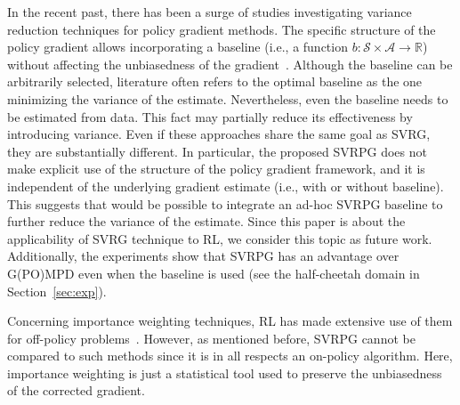\documentclass{article}
\makeatletter
\theoremstyle{remark}
\theoremstyle{definition}
\DeclareRobustCommand{\eg}{e.g.,\@\xspace}
\DeclareRobustCommand{\ie}{i.e.,\@\xspace}
\newcommand{\realspace}{\mathbb R}      %
\makeatother
\begin{document}
In the recent past, there has been a surge of studies investigating variance reduction techniques for policy gradient methods.
The specific structure of the policy gradient allows incorporating a baseline (\ie a function $b :\mathcal{S}\times\mathcal{A} \to \realspace$) without affecting the unbiasedness of the gradient~\citep[\eg][]{williams1992simple,weaver2001optimal,peters2008reinforcement,Thomas2017actionbaseline,wu2018variance}.
Although the baseline can be arbitrarily selected, literature often refers to the optimal baseline as the one minimizing the variance of the estimate.
Nevertheless, even the baseline needs to be estimated from data. This fact may partially reduce its effectiveness by introducing variance.
Even if these approaches share the same goal as SVRG, they are substantially different.
In particular, the proposed SVRPG does not make explicit use of the structure of the policy gradient framework, and it is independent of the underlying gradient estimate (\ie with or without baseline).
This suggests that would be possible to integrate an ad-hoc SVRPG baseline to further reduce the variance of the estimate.
Since this paper is about the applicability of SVRG technique to RL, we consider this topic as future work.
Additionally, the experiments show that SVRPG has an advantage over G(PO)MPD even when the baseline is used (see the half-cheetah domain in Section~\ref{sec:exp}).

Concerning importance weighting techniques, RL has made extensive use of them for off-policy problems~\citep[\eg][]{precup2000eligibility,thomas2015high}. However, as mentioned before, SVRPG cannot be compared to such methods since it is in all respects an on-policy algorithm. Here, importance weighting is just a statistical tool used to preserve the unbiasedness of the corrected gradient.

\vspace{-0.05in}
\end{document}
